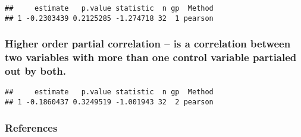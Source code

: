 \documentclass[
]{book}
\newenvironment{Shaded}{\begin{snugshade}}{\end{snugshade}}
\newcommand{\DocumentationTok}[1]{\textcolor[rgb]{0.56,0.35,0.01}{\textbf{\textit{#1}}}}
\newcommand{\FunctionTok}[1]{\textcolor[rgb]{0.13,0.29,0.53}{\textbf{#1}}}
\newcommand{\NormalTok}[1]{#1}
\newcommand{\SpecialCharTok}[1]{\textcolor[rgb]{0.81,0.36,0.00}{\textbf{#1}}}
\newcommand{\StringTok}[1]{\textcolor[rgb]{0.31,0.60,0.02}{#1}}
\theoremstyle{definition}
\theoremstyle{definition}
\theoremstyle{definition}
\theoremstyle{definition}
\theoremstyle{remark}
\begin{document}
\begin{Shaded}
\end{Shaded}

\begin{verbatim}
##     estimate   p.value statistic  n gp  Method
## 1 -0.2303439 0.2125285 -1.274718 32  1 pearson
\end{verbatim}

\hypertarget{higher-order-partial-correlation-is-a-correlation-between-two-variables-with-more-than-one-control-variable-partialed-out-by-both.}{%
\subsubsection{Higher order partial correlation -- is a correlation between two variables with more than one control variable partialed out by both.}\label{higher-order-partial-correlation-is-a-correlation-between-two-variables-with-more-than-one-control-variable-partialed-out-by-both.}}

\begin{Shaded}
\end{Shaded}

\begin{verbatim}
##     estimate   p.value statistic  n gp  Method
## 1 -0.1860437 0.3249519 -1.001943 32  2 pearson
\end{verbatim}

\hypertarget{references}{%
\subsubsection{References}\label{references}}
\end{document}
